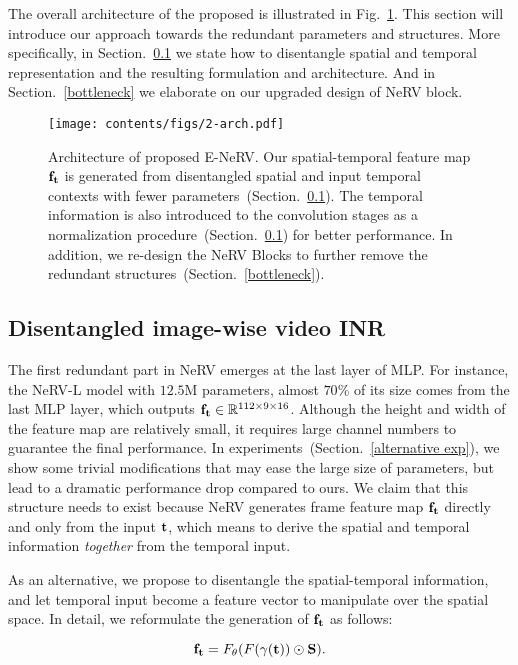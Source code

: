 \documentclass[runningheads]{llncs}
\begin{document}
The overall architecture of the proposed \netname is illustrated in Fig.~\ref{fig:arch}. This section will introduce our approach towards the redundant parameters and structures. More specifically, in Section.~\ref{frame condition} we state how to disentangle spatial and temporal representation and the resulting formulation and architecture. And in Section.~\ref{bottleneck} we elaborate on our upgraded design of NeRV block. 


\begin{figure}[t]
    \centering
    \texttt{[image: contents/figs/2-arch.pdf]}
    \caption{Architecture of proposed E-NeRV. Our spatial-temporal feature map $\mathbf{f}_{\mathbf{t}}$ is generated from disentangled spatial and input temporal contexts with fewer parameters~(Section.~\ref{frame condition}). The temporal information is also introduced to the convolution stages as a normalization procedure~(Section.~\ref{frame condition}) for better performance. In addition, we re-design the NeRV Blocks to further remove the redundant structures~(Section.~\ref{bottleneck}).}
    \label{fig:arch}
\end{figure}

\subsection{Disentangled image-wise video INR}
\label{frame condition}

The first redundant part in NeRV emerges at the last layer of MLP. For instance, the NeRV-L model with $12.5$M parameters, almost $70\%$ of its size comes from the last MLP layer, which outputs $\mathbf{f}_{\mathbf{t}}\in \mathbb{R}^{112\times 9\times 16}$. Although the height and width of the feature map are relatively small, it requires large channel numbers to guarantee the final performance. In experiments~(Section.~\ref{alternative exp}), we show some trivial modifications that may ease the large size of parameters, but lead to a dramatic performance drop compared to ours. We claim that this structure needs to exist because NeRV generates frame feature map $\mathbf{f}_{\mathbf{t}}$ directly and only from the input $\mathbf{t}$, which means to derive the spatial and temporal information \textit{together} from the temporal input. 

As an alternative, we propose to disentangle the spatial-temporal information, and let temporal input become a feature vector to manipulate over the spatial space. In detail, we reformulate the generation of $\mathbf{f}_{\mathbf{t}}$ as follows:

\begin{equation}
    \mathbf{f}_{\mathbf{t}} = F_{\theta}(F(\gamma(\mathbf{t}))\odot\mathbf{S}).
    \label{eq:disentagle_formulaton}
\end{equation}
\end{document}
